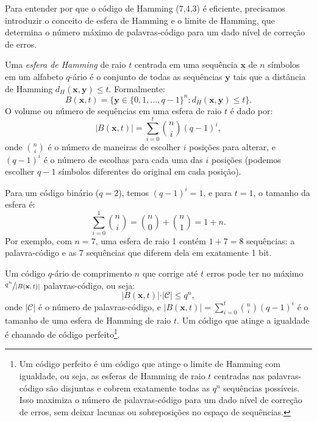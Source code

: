 Para entender por que o código de Hamming (7,4,3) é eficiente, precisamos
introduzir o conceito de esfera de Hamming e o limite de Hamming, que
determina o número máximo de palavras-código para um dado nível de correção de
erros.

\begin{definition}
Uma \emph{esfera de Hamming} de raio $t$ centrada em uma sequência $\mathbf{x}$ de $n$ 
símbolos em um alfabeto $q$-ário é o conjunto de todas as sequências $\mathbf{y}$ 
tais que a distância de Hamming $d_H(\mathbf{x}, \mathbf{y}) \leq t$. 
Formalmente:
\begin{equation}
B(\mathbf{x}, t) = \{ \mathbf{y} \in \{0, 1, \dots, q-1\}^n : d_H(\mathbf{x}, \mathbf{y}) \leq t \}.
\end{equation}
O volume ou número de sequências em uma esfera de raio $t$ é dado por:
\begin{equation}
|B(\mathbf{x}, t)| = \sum_{i=0}^{t} \binom{n}{i} (q-1)^i,
\end{equation}
onde $\binom{n}{i}$ é o número de maneiras de escolher $i$ posições para alterar, 
e $(q-1)^i$ é o número de escolhas para cada uma das $i$ posições 
(podemos escolher $q-1$ símbolos diferentes do original em cada posição).
\end{definition}

Para um código binário ($q = 2$), temos $(q-1)^i = 1$, e para $t = 1$, o tamanho da esfera é:
\begin{equation}
\sum_{i=0}^{1} \binom{n}{i} = \binom{n}{0} + \binom{n}{1} = 1 + n.
\end{equation}
Por exemplo, com $n = 7$, uma esfera de raio 1 contém $1 + 7 = 8$ sequências: 
a palavra-código e as 7 sequências que diferem dela em exatamente 1 bit.

\begin{theorem}
Um código $q$-ário de comprimento $n$ que corrige até $t$ erros pode ter no máximo
$\sfrac{q^n}{|B(\mathbf{x}, t)|}$ palavras-código, ou seja:
\begin{equation}
|B(\mathbf{x}, t)| \cdot \vert \mathcal{C} \vert \leq q^n,
\end{equation}
onde $\vert \mathcal{C} \vert$ é o número de palavras-código, e 
$|B(\mathbf{x}, t)| = \sum_{i=0}^{t} \binom{n}{i} (q-1)^i$ é o tamanho de uma esfera de Hamming 
de raio $t$. Um código que atinge a igualdade é chamado de código perfeito\footnote[][-2cm]{
Um código perfeito é um código que atinge o limite de Hamming com igualdade, ou seja, 
as esferas de Hamming de raio $t$ centradas nas palavras-código são disjuntas e cobrem 
exatamente todas as $q^n$ sequências possíveis. Isso maximiza o número de palavras-código 
para um dado nível de correção de erros, sem deixar lacunas ou sobreposições no espaço de sequências.}.
\end{theorem}

